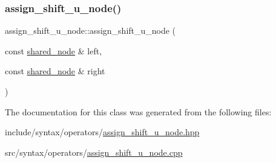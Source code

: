 \subsubsection{\texorpdfstring{assign\+\_\+shift\+\_\+u\+\_\+node()}{assign\_shift\_u\_node()}}
{\footnotesize\ttfamily assign\+\_\+shift\+\_\+u\+\_\+node\+::assign\+\_\+shift\+\_\+u\+\_\+node (\begin{DoxyParamCaption}\item[{const \hyperlink{namespacejawe_a3f307481d921b6cbb50cc8511fc2b544}{shared\+\_\+node} \&}]{left,  }\item[{const \hyperlink{namespacejawe_a3f307481d921b6cbb50cc8511fc2b544}{shared\+\_\+node} \&}]{right }\end{DoxyParamCaption})}



The documentation for this class was generated from the following files\+:\begin{DoxyCompactItemize}
\item 
include/syntax/operators/\hyperlink{assign__shift__u__node_8hpp}{assign\+\_\+shift\+\_\+u\+\_\+node.\+hpp}\item 
src/syntax/operators/\hyperlink{assign__shift__u__node_8cpp}{assign\+\_\+shift\+\_\+u\+\_\+node.\+cpp}\end{DoxyCompactItemize}
